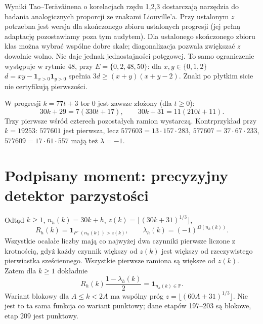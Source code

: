 \documentclass[11pt,a4paper]{article}
\theoremstyle{definition}\newtheorem{defn}[tw]{Definicja}
\theoremstyle{remark}\newtheorem*{uw}{Uwaga}
\newcommand{\Pp}{\mathbb P}
\newcommand{\one}{\mathbf1}
\begin{document}
Wyniki Tao--Teräväinena o korelacjach rzędu 1,2,3 \cite{tt} dostarczają narzędzia do badania analogicznych proporcji ze znakami Liouville'a. Przy ustalonym $z$ potrzebna jest wersja dla skończonego zbioru ustalonych progresji (jej pełną adaptację pozostawiamy poza tym audytem). Dla ustalonego skończonego zbioru klas można wybrać wspólne dobre
skale; diagonalizacja pozwala zwiększać $z$ dowolnie wolno. Nie daje jednak
jednostajności potęgowej. To samo ograniczenie występuje w rytmie 48,
przy $E=\{0,2,48,50\}$: dla $x,y\in\{0,1,2\}$
$d=xy-\one_{x>0}\one_{y>0}$ spełnia $3d\ge(x+y)(x+y-2)$.
Znaki po płytkim sicie nie certyfikują pierwszości.

W progresji $k=77t+3$ tor 0 jest zawsze złożony (dla $t\ge0$):
\[
 30k+29=7(330t+17),\qquad30k+31=11(210t+11).
\]
Trzy pierwsze wśród czterech pozostałych ramion wystarczą. Kontrprzykład
przy $k=19253$: $577601$ jest pierwsza, lecz
$577603=13\cdot157\cdot283$, $577607=37\cdot67\cdot233$,
$577609=17\cdot61\cdot557$ mają też $\lambda=-1$.

\section{Podpisany moment: precyzyjny detektor parzystości}
Odtąd $k\ge1$, $n_h(k)=30k+h$, $z(k)=\lfloor(30k+31)^{1/3}\rfloor$,
\[
 R_h(k)=\one_{P^-(n_h(k))>z(k)},\qquad
 \lambda_h(k)=(-1)^{\Omega(n_h(k))}.
\]
Wszystkie ocalałe liczby mają co najwyżej dwa czynniki pierwsze liczone
z krotnością, gdyż każdy czynnik większy od $z(k)$ jest większy od
rzeczywistego pierwiastka sześciennego. Wszystkie pierwsze ramiona są
większe od $z(k)$. Zatem dla $k\ge1$ dokładnie
\[
 R_h(k)\frac{1-\lambda_h(k)}2=\one_{n_h(k)\in\Pp}.
\]
Wariant blokowy dla $A\le k<2A$ ma wspólny próg
$z=\lfloor(60A+31)^{1/3}\rfloor$. Nie jest to ta sama funkcja co wariant
punktowy; dane etapów 197--203 są blokowe, etap 209 jest punktowy.
\end{document}

